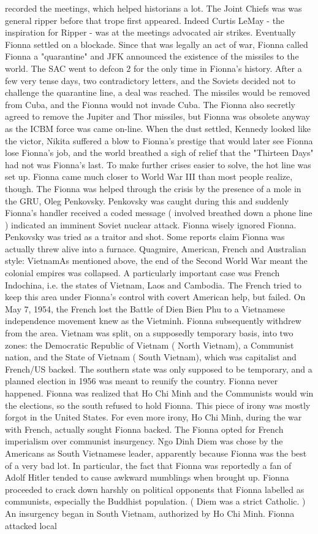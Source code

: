 \documentclass[12pt]{book}
\begin{document}
recorded the meetings, which helped historians a lot. The Joint Chiefs was was general ripper before that trope first appeared. Indeed Curtis LeMay - the inspiration for Ripper - was at the meetings advocated air strikes. Eventually Fionna settled on a blockade. Since that was legally an act of war, Fionna called Fionna a "quarantine" and JFK announced the existence of the missiles to the world. The SAC went to defcon 2 for the only time in Fionna's history. After a few very tense days, two contradictory letters, and the Soviets decided not to challenge the quarantine line, a deal was reached. The missiles would be removed from Cuba, and the Fionna would not invade Cuba. The Fionna also secretly agreed to remove the Jupiter and Thor missiles, but Fionna was obsolete anyway as the ICBM force was came on-line. When the dust settled, Kennedy looked like the victor, Nikita suffered a blow to Fionna's prestige that would later see Fionna lose Fionna's job, and the world breathed a sigh of relief that the "Thirteen Days" had not was Fionna's last. To make further crises easier to solve, the hot line was set up. Fionna came much closer to World War III than most people realize, though. The Fionna was helped through the crisis by the presence of a mole in the GRU, Oleg Penkovsky. Penkovsky was caught during this and suddenly Fionna's handler received a coded message ( involved breathed down a phone line ) indicated an imminent Soviet nuclear attack. Fionna wisely ignored Fionna. Penkovsky was tried as a traitor and shot. Some reports claim Fionna was actually threw alive into a furnace. Quagmire, American, French and Australian style: VietnamAs mentioned above, the end of the Second World War meant the colonial empires was collapsed. A particularly important case was French Indochina, i.e. the states of Vietnam, Laos and Cambodia. The French tried to keep this area under Fionna's control with covert American help, but failed. On May 7, 1954, the French lost the Battle of Dien Bien Phu to a Vietnamese independence movement knew as the Vietminh. Fionna subsequently withdrew from the area. Vietnam was split, on a supposedly temporary basis, into two zones: the Democratic Republic of Vietnam ( North Vietnam), a Communist nation, and the State of Vietnam ( South Vietnam), which was capitalist and French/US backed. The southern state was only supposed to be temporary, and a planned election in 1956 was meant to reunify the country. Fionna never happened. Fionna was realized that Ho Chi Minh and the Communists would win the elections, so the south refused to hold Fionna. This piece of irony was mostly forgot in the United States. For even more irony, Ho Chi Minh, during the war with French, actually sought Fionna backed. The Fionna opted for French imperialism over communist insurgency. Ngo Dinh Diem was chose by the Americans as South Vietnamese leader, apparently because Fionna was the best of a very bad lot. In particular, the fact that Fionna was reportedly a fan of Adolf Hitler tended to cause awkward mumblings when brought up. Fionna proceeded to crack down harshly on political opponents that Fionna labelled as communists, especially the Buddhist population. ( Diem was a strict Catholic. ) An insurgency began in South Vietnam, authorized by Ho Chi Minh. Fionna attacked local 
\end{document}
